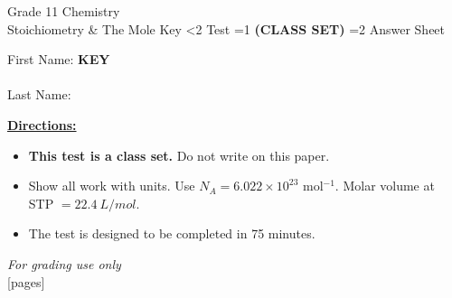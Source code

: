 \documentclass[addpoints]{exam}
\newcommand{\event}{Stoichiometry \& The Mole}
\newcommand{\tournament}{}
\def\type{0}
\begin{document}
\begin{center}
    {\huge Grade 11 Chemistry \\ \event
    \ifprintanswers \space Key
    \else \space \ifnum\type<2 Test \fi \ifnum\type=1 \textbf{(CLASS SET)} \fi
          \ifnum\type=2 Answer Sheet \fi
    \fi \\ \vspace{3mm}\tournament\vspace{1mm}}
\end{center}

\vspace{.25\textheight}

\begin{center}
    First Name: \ifprintanswers
    \underline{\hspace{3.5cm}}\textbf{KEY}\underline{\hspace{5.5cm}}\\\vspace{5mm}
    \else \underline{\hspace{10cm}}\\ \vspace{5mm} \fi
    Last Name: \underline{\hspace{10cm}}\\ \vspace{5mm}
\end{center}

\noindent\textbf{\underline{Directions:}}
\begin{itemize}
    \ifnum\type=1 \item \textbf{This test is a class set.} Do not write on this paper. \fi
    \item Show all work with units. Use $N_A = 6.022 \times 10^{23}$ mol$^{-1}$.
    Molar volume at STP $= \SI{22.4}{L/mol}$.
    \item The test is designed to be completed in 75 minutes.
\end{itemize}
\begin{center}
\textit{For grading use only}\\
[pages]
\end{center}
\end{document}
